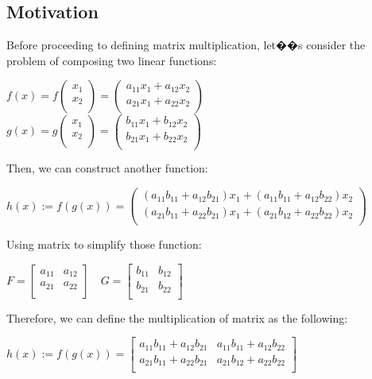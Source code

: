 \documentclass[UTF8,a4paper, 10pt, openany]{svmono}
\begin{document}
\subsection{Motivation}
Before proceeding to defining matrix multiplication, let��s consider the problem of composing two linear functions:
\begin{center}
$f(x)=f
\left(
\begin{array}{c}
x_{1} \\ 
x_{2} \\
\end{array}
\right)=
\left(
\begin{array}{c}
a_{11}x_1+a_{12}x_{2} \\ 
a_{21}x_1+a_{22}x_{2} \\
\end{array}
\right)
$\\
$
g(x)=g
\left(
\begin{array}{c}
x_{1} \\ 
x_{2} \\
\end{array}
\right)=
\left(
\begin{array}{c}
b_{11}x_1+b_{12}x_{2} \\ 
b_{21}x_1+b_{22}x_{2} \\
\end{array}
\right)
$
\end{center}
Then, we can construct another function:
\begin{center}
$h(x):=
f(g(x))=
\left(
\begin{array}{c}
(a_{11}b_{11}+a_{12}b_{21})x_1+(a_{11}b_{11}+a_{12}b_{22})x_{2} \\ 
(a_{21}b_{11}+a_{22}b_{21})x_1+(a_{21}b_{12}+a_{22}b_{22})x_{2} \\
\end{array}
\right)
$
\end{center}
Using matrix to simplify those function:
\begin{center}
$F=
\left[
\begin{array}{cc}
a_{11} & a_{12} \\ 
a_{21} & a_{22} \\
\end{array}
\right] \quad
G=
\left[
\begin{array}{cc}
b_{11} & b_{12} \\ 
b_{21} & b_{22} \\
\end{array}
\right]
$
\end{center}
Therefore, we can define the multiplication of matrix as the following:
\begin{center}
$h(x):=
f(g(x))=
\left[
\begin{array}{cc}
a_{11}b_{11}+a_{12}b_{21} & a_{11}b_{11}+a_{12}b_{22} \\ 
a_{21}b_{11}+a_{22}b_{21} & a_{21}b_{12}+a_{22}b_{22} \\
\end{array}
\right]
$
\end{center}
\end{document}
